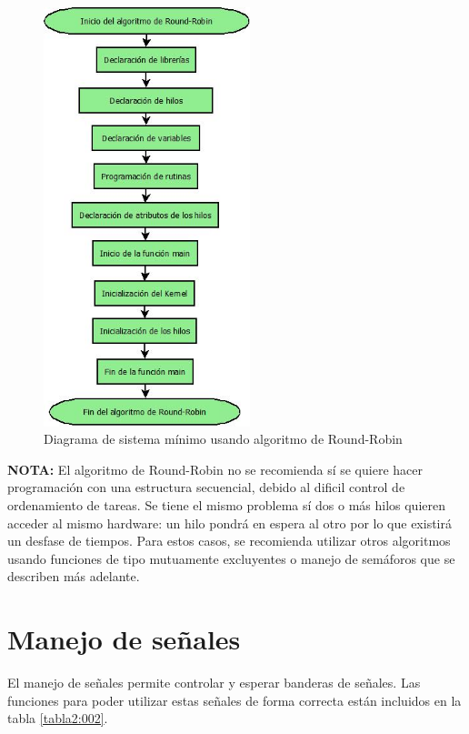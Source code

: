 \documentclass[12pt, twoside]{report}
\begin{document}
\begin{figure}[H]
	\centering
	\includegraphics[width=60mm]{diaround}
	\caption{Diagrama de sistema mínimo usando algoritmo de Round-Robin}
	\label{cap2:003}
\end{figure}

\textbf{NOTA:}
El algoritmo de Round-Robin no se recomienda sí se quiere hacer programación con una estructura secuencial, debido al dificil control de ordenamiento de tareas. Se tiene el mismo problema sí dos o más hilos quieren acceder al mismo hardware: un hilo pondrá en espera al otro por lo que existirá un desfase de tiempos. Para estos casos, se recomienda utilizar otros algoritmos usando funciones de tipo mutuamente excluyentes o manejo de semáforos que se describen más adelante.

\section{Manejo de señales}

El manejo de señales permite controlar y esperar banderas de señales. Las funciones para poder utilizar estas señales de forma correcta están incluidos en la  tabla \ref{tabla2:002}.
\end{document}
